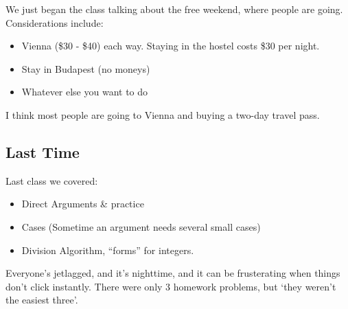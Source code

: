 \documentclass[10pt,oneside]{book}
\begin{document}
%
%
We just began the class talking about the free weekend, where people are going. Considerations include:
\begin{itemize}[itemsep=0pt]
    \item Vienna (\$30 - \$40) each way. Staying in the hostel costs \$30 per night.
    \item Stay in Budapest (no moneys)
    \item Whatever else you want to do
\end{itemize}
I think most people are going to Vienna and buying a two-day travel pass. 
\subsection*{Last Time}
Last class we covered:
\begin{itemize}[itemsep=0pt]
    \item Direct Arguments \& practice
    \item Cases (Sometime an argument needs several small cases)
    \item Division Algorithm, ``forms'' for integers. 
\end{itemize}
Everyone's jetlagged, and it's nighttime, and it can be frusterating when things don't click instantly. There were only 3 homework problems, but `they weren't the easiest three'.
\end{document}
